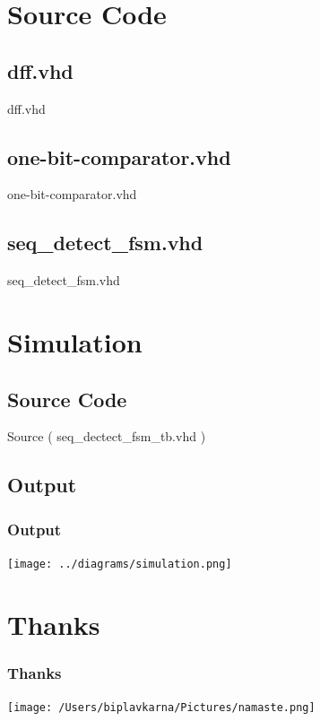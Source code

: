 \documentclass{beamer}
\begin{document}
\section{Source Code}
\subsection{dff.vhd}
dff.vhd
\begin{tiny}

\end{tiny}

\break

\subsection{one-bit-comparator.vhd}
one-bit-comparator.vhd
\begin{tiny}

\end{tiny}
\break

\subsection{seq\_detect\_fsm.vhd}
\begin{small}
seq\_detect\_fsm.vhd
\end{small}
\begin{tiny}

\end{tiny}


\break
\section{Simulation}
\subsection{Source Code}
\begin{small}
Source ( seq\_dectect\_fsm\_tb.vhd )
\end{small}
\begin{tiny}

\end{tiny}

\break

\subsection{Output}
\begin{frame}
\frametitle{Output}
\texttt{[image: ../diagrams/simulation.png]}
\end{frame}

\section{Thanks}
\begin{frame}
\frametitle{Thanks}
\texttt{[image: /Users/biplavkarna/Pictures/namaste.png]}
\end{frame}
\end{document}
